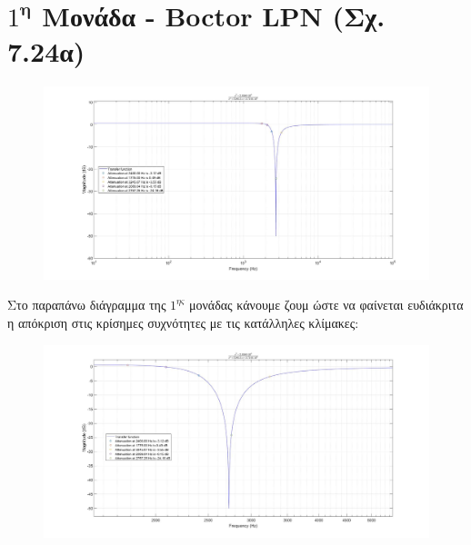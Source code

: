\documentclass{article}
\begin{document}
{{\section*{$1^\textbf{η}$ Μονάδα - Boctor LPN (Σχ. 7.24α)} 
  \begin{figure}[h!]
\centering
 	\advance\leftskip-4cm
  \includegraphics[width=180mm,scale=2]{thema3/matlab0.jpg}
\end{figure} 
\normalsize{}
Στο παραπάνω διάγραμμα της $1^{ης}$ μονάδας κάνουμε ζουμ ώστε να φαίνεται ευδιάκριτα η απόκριση στις κρίσημες συχνότητες με τις κατάλληλες κλίμακες:
\large{}
  \begin{figure}[h!]
\centering
 	\advance\leftskip-1cm
  \includegraphics[width=120mm,scale=2]{thema3/z1.jpg}
\end{figure} 
\newpage
}}
\end{document}
